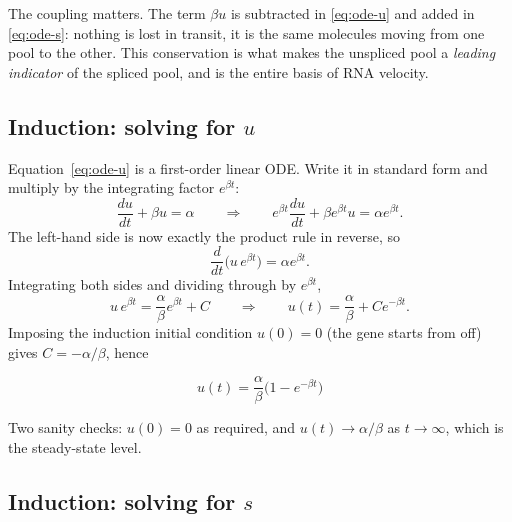 \documentclass[11pt,a4paper]{article}
\newenvironment{keybox}{\begin{shaded}\noindent}{\end{shaded}}
\newcommand{\uns}{u}
\theoremstyle{definition}
\begin{document}
The coupling matters. The term $\beta \uns$ is subtracted in
\eqref{eq:ode-u} and added in \eqref{eq:ode-s}: nothing is lost in transit, it
is the same molecules moving from one pool to the other. This conservation is
what makes the unspliced pool a \emph{leading indicator} of the spliced pool,
and is the entire basis of RNA velocity.

\subsection{Induction: solving for \texorpdfstring{$u$}{u}}

Equation~\eqref{eq:ode-u} is a first-order linear ODE. Write it in standard
form and multiply by the integrating factor $e^{\beta t}$:
%
\begin{equation}
\frac{d\uns}{dt} + \beta \uns = \alpha
\qquad\Longrightarrow\qquad
e^{\beta t}\frac{d\uns}{dt} + \beta e^{\beta t}\uns = \alpha e^{\beta t}.
\end{equation}
%
The left-hand side is now exactly the product rule in reverse, so
%
\begin{equation}
\frac{d}{dt}\Big(\uns\, e^{\beta t}\Big) = \alpha e^{\beta t}.
\end{equation}
%
Integrating both sides and dividing through by $e^{\beta t}$,
%
\begin{equation}
\uns\, e^{\beta t} = \frac{\alpha}{\beta}e^{\beta t} + C
\qquad\Longrightarrow\qquad
\uns(t) = \frac{\alpha}{\beta} + C e^{-\beta t}.
\end{equation}
%
Imposing the induction initial condition $\uns(0) = 0$ (the gene starts from
off) gives $C = -\alpha/\beta$, hence
%
\begin{keybox}
\begin{equation}
\boxed{\;\uns(t) = \frac{\alpha}{\beta}\Big(1 - e^{-\beta t}\Big)\;}
\label{eq:u-ind}
\end{equation}
\end{keybox}
%
Two sanity checks: $\uns(0) = 0$ as required, and $\uns(t) \to \alpha/\beta$ as
$t \to \infty$, which is the steady-state level.

\subsection{Induction: solving for \texorpdfstring{$s$}{s}}
\end{document}
